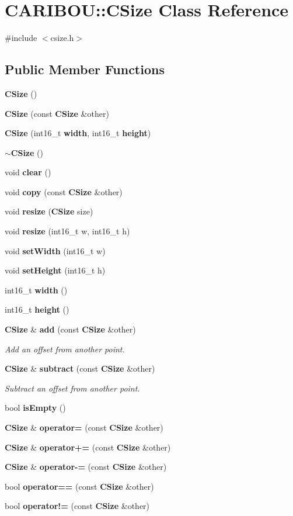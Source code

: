 \section{C\-A\-R\-I\-B\-O\-U\-:\-:C\-Size Class Reference}
\label{class_c_a_r_i_b_o_u_1_1_c_size}


{\ttfamily \#include $<$csize.\-h$>$}

\subsection*{Public Member Functions}
\begin{DoxyCompactItemize}
\item 
{\bf C\-Size} ()
\item 
{\bf C\-Size} (const {\bf C\-Size} \&other)
\item 
{\bf C\-Size} (int16\-\_\-t {\bf width}, int16\-\_\-t {\bf height})
\item 
{\bf $\sim$\-C\-Size} ()
\item 
void {\bf clear} ()
\item 
void {\bf copy} (const {\bf C\-Size} \&other)
\item 
void {\bf resize} ({\bf C\-Size} size)
\item 
void {\bf resize} (int16\-\_\-t w, int16\-\_\-t h)
\item 
void {\bf set\-Width} (int16\-\_\-t w)
\item 
void {\bf set\-Height} (int16\-\_\-t h)
\item 
int16\-\_\-t {\bf width} ()
\item 
int16\-\_\-t {\bf height} ()
\item 
{\bf C\-Size} \& {\bf add} (const {\bf C\-Size} \&other)
\begin{DoxyCompactList}\small\item\em Add an offset from another point. \end{DoxyCompactList}\item 
{\bf C\-Size} \& {\bf subtract} (const {\bf C\-Size} \&other)
\begin{DoxyCompactList}\small\item\em Subtract an offset from another point. \end{DoxyCompactList}\item 
bool {\bf is\-Empty} ()
\item 
{\bf C\-Size} \& {\bf operator=} (const {\bf C\-Size} \&other)
\item 
{\bf C\-Size} \& {\bf operator+=} (const {\bf C\-Size} \&other)
\item 
{\bf C\-Size} \& {\bf operator-\/=} (const {\bf C\-Size} \&other)
\item 
bool {\bf operator==} (const {\bf C\-Size} \&other)
\item 
bool {\bf operator!=} (const {\bf C\-Size} \&other)
\end{DoxyCompactItemize}


